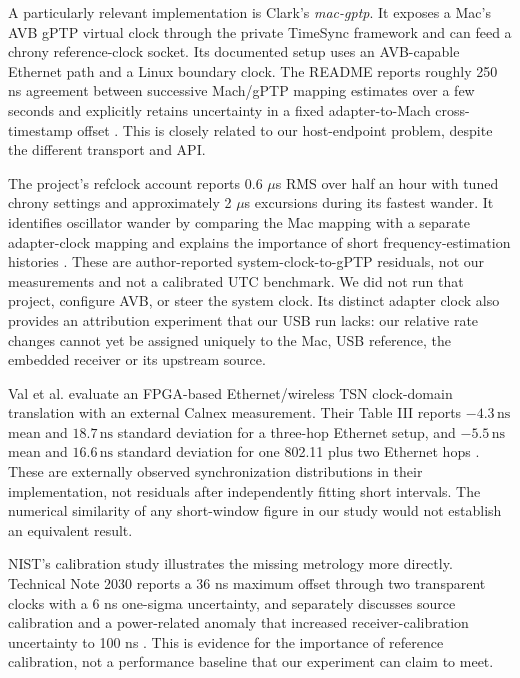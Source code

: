 \documentclass[11pt,letterpaper]{article}
\newcommand{\ns}{\,\mathrm{ns}}\newcommand{\us}{\,\mu\mathrm{s}}\newcommand{\ms}{\,\mathrm{ms}}\newcommand{\ppm}{\,\mathrm{ppm}}
\begin{document}
A particularly relevant implementation is Clark's \emph{mac-gptp}. It exposes a Mac's AVB gPTP virtual clock through the private TimeSync framework and can feed a chrony reference-clock socket. Its documented setup uses an AVB-capable Ethernet path and a Linux boundary clock. The README reports roughly 250 ns agreement between successive Mach/gPTP mapping estimates over a few seconds and explicitly retains uncertainty in a fixed adapter-to-Mach cross-timestamp offset \cite{macgptp}. This is closely related to our host-endpoint problem, despite the different transport and API.

The project's refclock account reports 0.6 $\mu$s RMS over half an hour with tuned chrony settings and approximately 2 $\mu$s excursions during its fastest wander. It identifies oscillator wander by comparing the Mac mapping with a separate adapter-clock mapping and explains the importance of short frequency-estimation histories \cite{macrefclock}. These are author-reported system-clock-to-gPTP residuals, not our measurements and not a calibrated UTC benchmark. We did not run that project, configure AVB, or steer the system clock. Its distinct adapter clock also provides an attribution experiment that our USB run lacks: our relative rate changes cannot yet be assigned uniquely to the Mac, USB reference, the embedded receiver or its upstream source.

Val et al. evaluate an FPGA-based Ethernet/wireless TSN clock-domain translation with an external Calnex measurement. Their Table III reports $-4.3\ns$ mean and $18.7\ns$ standard deviation for a three-hop Ethernet setup, and $-5.5\ns$ mean and $16.6\ns$ standard deviation for one 802.11 plus two Ethernet hops \cite{val}. These are externally observed synchronization distributions in their implementation, not residuals after independently fitting short intervals. The numerical similarity of any short-window figure in our study would not establish an equivalent result.

NIST's calibration study illustrates the missing metrology more directly. Technical Note 2030 reports a 36 ns maximum offset through two transparent clocks with a 6 ns one-sigma uncertainty, and separately discusses source calibration and a power-related anomaly that increased receiver-calibration uncertainty to 100 ns \cite{nist2030}. This is evidence for the importance of reference calibration, not a performance baseline that our experiment can claim to meet.
\end{document}
